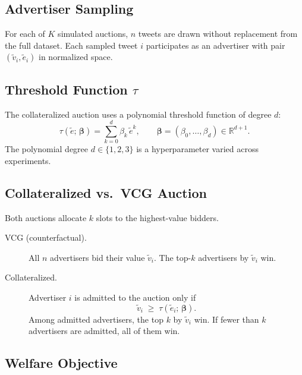 \documentclass[11pt]{article}
\begin{document}
\subsection{Advertiser Sampling}

For each of $K$ simulated auctions, $n$ tweets are drawn without replacement from the
full dataset. Each sampled tweet $i$ participates as an advertiser with pair
$(\tilde{v}_i, \tilde{e}_i)$ in normalized space.

\subsection{Threshold Function $\tau$}

The collateralized auction uses a polynomial threshold function of degree $d$:
\begin{equation}
    \tau(\tilde{e};\,\boldsymbol{\beta})
    = \sum_{k=0}^{d} \beta_k\, \tilde{e}^k,
    \qquad \boldsymbol{\beta} = (\beta_0, \ldots, \beta_d) \in \mathbb{R}^{d+1}.
\end{equation}
The polynomial degree $d \in \{1, 2, 3\}$ is a hyperparameter varied across experiments.

\subsection{Collateralized vs.\ VCG Auction}

Both auctions allocate $k$ slots to the highest-value bidders.

\begin{description}
    \item[VCG (counterfactual).] All $n$ advertisers bid their value $\tilde{v}_i$.
    The top-$k$ advertisers by $\tilde{v}_i$ win.

    \item[Collateralized.] Advertiser $i$ is admitted to the auction only if
    \begin{equation}
        \tilde{v}_i \;\geq\; \tau(\tilde{e}_i;\,\boldsymbol{\beta}).
    \end{equation}
    Among admitted advertisers, the top $k$ by $\tilde{v}_i$ win.
    If fewer than $k$ advertisers are admitted, all of them win.
\end{description}

\subsection{Welfare Objective}
\end{document}
